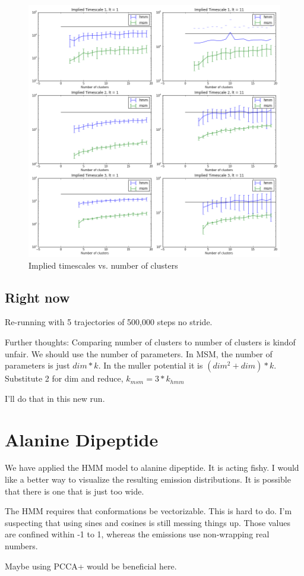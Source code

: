 \documentclass[10pt]{article}
\begin{document}
\begin{figure}[htbp!]
	\centering
	\includegraphics[width=1.0\textwidth]{its_vs_k.png}
	\caption{Implied timescales vs. number of clusters}
	\label{its_vs_k}
\end{figure}

\subsection{Right now}
Re-running with 5 trajectories of 500,000 steps no stride.

Further thoughts: Comparing number of clusters to number of clusters
is kindof unfair. We should use the number of parameters. In MSM, the number
of parameters is just $dim*k$. In the muller potential it is $(dim^2 + dim)*k$.
Substitute 2 for dim and reduce, $k_{msm} = 3*k_{hmm}$

I'll do that in this new run.

\section{Alanine Dipeptide}
We have applied the HMM model to alanine dipeptide. It is acting fishy.
I would like a better way to visualize the resulting emission distributions.
It is possible that there is one that is just too wide.

The HMM requires that conformations be vectorizable. This is hard to do. I'm suspecting
that using sines and cosines is still messing things up. Those values are confined within
-1 to 1, whereas the emissions use non-wrapping real numbers.

Maybe using PCCA+ would be beneficial here.
\end{document}
